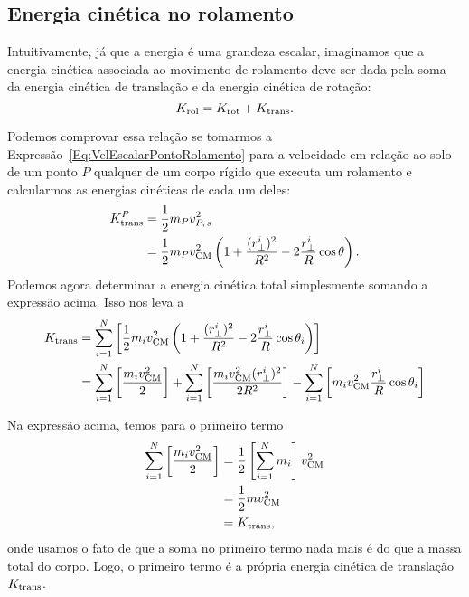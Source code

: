 \subsection{Energia cinética no rolamento}

Intuitivamente, já que a energia é uma grandeza escalar, imaginamos que a energia cinética associada ao movimento de rolamento deve ser dada pela soma da energia cinética de translação e da energia cinética de rotação:
\begin{equation}
    K_{\rm{rol}} = K_{\rm{rot}} + K_{\rm{trans}}.
\end{equation}

Podemos comprovar essa relação se tomarmos a Expressão~\ref{Eq:VelEscalarPontoRolamento} para a velocidade em relação ao solo de um ponto $P$ qualquer de um corpo rígido que executa um rolamento e calcularmos as energias cinéticas de cada um deles:
\begin{align}
    K_{\rm{trans}}^P &= \frac{1}{2}m_P v_{P,\,s}^2 \\
    &= \frac{1}{2}m_P v_{\rm{CM}}^2 \left(1 + \frac{(r_\perp^i)^2}{R^2} - 2\frac{r_\perp^i}{R}\cos\theta\right).
\end{align}
%
Podemos agora determinar a energia cinética total simplesmente somando a expressão acima. Isso nos leva a
\begin{align}
    K_{\rm{trans}} &= \sum_{i=1}^N \left[\frac{1}{2}m_i v_{\rm{CM}}^2 \left(1 + \frac{(r_\perp^i)^2}{R^2} - 2\frac{r_\perp^i}{R}\cos\theta_i\right) \right] \\
    &= \sum_{i=1}^N \left[\frac{m_i v_{\rm{CM}}^2}{2}\right] + \sum_{i=1}^N \left[\frac{m_i v_{\rm{CM}}^2 (r_\perp^i)^2}{2R^2} \right] - \sum_{i=1}^N \left[m_i v_{\rm{CM}}^2 \frac{r_\perp^i}{R}\cos\theta_i\right]
\end{align}

Na expressão acima, temos para o primeiro termo
\begin{align}
    \sum_{i=1}^N \left[\frac{m_i v_{\rm{CM}}^2}{2}\right] &= \frac{1}{2} \left[\sum_{i=1}^N m_i \right] v_{\rm{CM}}^2 \\
    &= \frac{1}{2} m v_{\rm{CM}}^2 \\
    &= K_{\rm{trans}},
\end{align}
%
onde usamos o fato de que a soma no primeiro termo nada mais é do que a massa total do corpo. Logo, o primeiro termo é a própria energia cinética de translação $K_{\rm{trans}}$.


